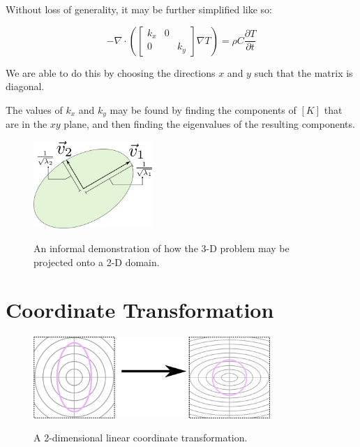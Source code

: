 Without loss of generality, it may be further simplified like so:

\begin{equation}
-\nabla \cdot \left(\begin{bmatrix}k_x & 0\\ 0 && k_y\end{bmatrix}\nabla T \right)= \rho C\frac{\partial T}{\partial t}
\end{equation}

We are able to do this by choosing the directions \(x\) and \(y\) such that the
matrix is diagonal.

The values of \(k_x\) and \(k_y\) may be found by finding the components of
\([K]\) that are in the \(xy\) plane, and then finding the eigenvalues of the
resulting components.

\begin{figure}[h]
\centering
\includegraphics[width=0.4\textwidth]{fig/eigenstuff.png}
\label{fig:eigenstuff}
\caption{An informal demonstration of how the 3-D problem may be projected onto a 2-D domain.}
\end{figure}



\section{Coordinate Transformation}
\label{sec:analytical-np:transformation}

\begin{figure}[h]
\centering
\includegraphics[width=0.8\textwidth]{fig/coordinate_transformation.png}
\label{fig:coord_trans}
\caption{A 2-dimensional linear coordinate transformation.}
\end{figure}

